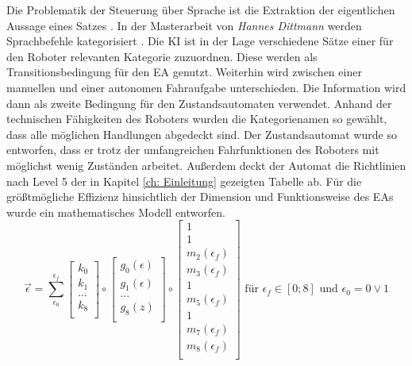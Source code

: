	Die Problematik der Steuerung über Sprache ist die Extraktion der eigentlichen Aussage eines Satzes \cite{Dittmann}. In der Masterarbeit von \textit{Hannes Dittmann} werden Sprachbefehle kategorisiert \cite{Dittmann}. Die KI ist in der Lage verschiedene Sätze einer für den Roboter relevanten Kategorie zuzuordnen. Diese werden als Transitionsbedingung für den EA genutzt. Weiterhin wird zwischen einer manuellen und einer autonomen Fahraufgabe unterschieden. Die Information wird dann als zweite Bedingung für den Zustandsautomaten verwendet. Anhand der technischen Fähigkeiten des Roboters wurden die Kategorienamen so gewählt, dass alle möglichen Handlungen abgedeckt sind. Der Zustandsautomat wurde so entworfen, dass er trotz der umfangreichen Fahrfunktionen des Roboters mit möglichst wenig Zuständen arbeitet. Außerdem deckt der Automat die Richtlinien nach Level 5 der in Kapitel \ref{ch: Einleitung} gezeigten Tabelle ab. Für die größtmögliche Effizienz hinsichtlich der Dimension und Funktionsweise des EAs wurde ein mathematisches Modell entworfen.\\
	
	\begin{equation}
	\vec{\epsilon}=\sum_{\epsilon_0}^{\epsilon_f} \left[ \begin{array}{r}
	k_0  \\
	k_{1}  \\
	...  \\
	k_8  \\
	\end{array}\right] \circ
	\left[ \begin{array}{r}
	g_0(\epsilon)  \\
	g_{1}(\epsilon)  \\
	...  \\
	g_8(z)  \\
	\end{array}\right]  \circ
	\left[ \begin{array}{r}
	1  \\
	1  \\
	m_{2}(\epsilon_f)  \\
	m_{3}(\epsilon_f)   \\
	1  \\
	m_{5}(\epsilon_f)  \\
	1   \\
	m_{7}(\epsilon_f)   \\
	m_8(\epsilon_f)  \\
	\end{array}\right]
	\text{ für }\epsilon_f\in[0;8] \text{ und }\epsilon_0=0 \vee 1
	\label{eq: statemachine}
	\end{equation}\\
	
